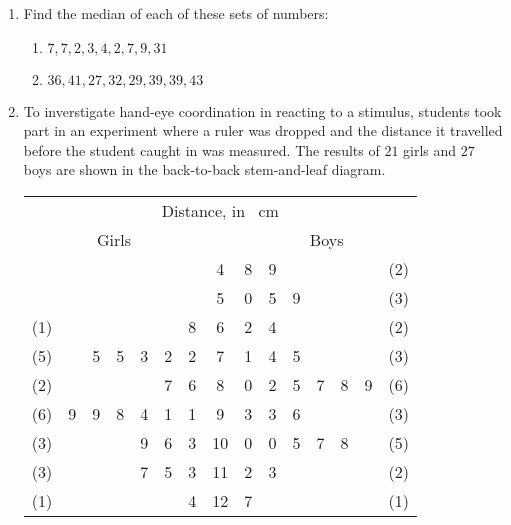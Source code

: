 \begin{enumerate}
	\item Find the median 	of each of these sets of numbers:
	\begin{enumerate}
		\item $7,7,2,3,4,2,7,9,31$
		\item  $36,41,27, 32,29, 39, 39, 43$
	\end{enumerate}


    \item  To inverstigate hand-eye coordination in reacting to a stimulus, students took part in an experiment where a ruler was dropped and the distance it travelled before the student caught in was measured. The results of $21$ girls and $27$ boys are shown in the back-to-back stem-and-leaf diagram.
    
 \begin{table}[!htpb]
 	\centering
 	\begin{tabular}{lllllll|c|lllllll}
 		\multicolumn{15}{c}{Distance, in~ cm}                                             \\
 		\multicolumn{7}{c}{Girls}   & \multicolumn{1}{c}{} & \multicolumn{7}{c}{Boys}     \\
 		&   &   &   &   &   &   & 4                    & 8 & 9 &   &   &   &   & (2)  \\
 		&   &   &   &   &   &   & 5                    & 0 & 5 & 9 &   &   &   & (3)  \\
 		(1) &   &   &   &   &   & 8 & 6                    & 2 & 4 &   &   &   &   & (2)  \\
 		(5) &   & 5 & 5 & 3 & 2 & 2 & 7                    & 1 & 4 & 5 &   &   &   & (3)  \\
 		(2) &   &   &   &   & 7 & 6 & 8                    & 0 & 2 & 5 & 7 & 8 & 9 & (6)  \\
 		(6) & 9 & 9 & 8 & 4 & 1 & 1 & 9                    & 3 & 3 & 6 &   &   &   & (3)  \\
 		(3) &   &   &   & 9 & 6 & 3 & 10                   & 0 & 0 & 5 & 7 & 8 &   & (5)  \\
 		(3) &   &   &   & 7 & 5 & 3 & 11                   & 2 & 3 &   &   &   &   & (2)  \\
 		(1) &   &   &   &   &   & 4 & 12                   & 7 &   &   &   &   &   & (1)  \\
 				
	\end{tabular}
 \vspace{4 pt}
 

\end{table}
\end{enumerate}
